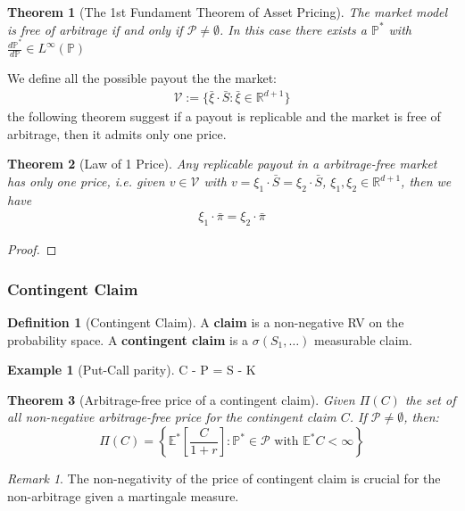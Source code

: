 \documentclass[a4paper,11pt]{book}
\newtheorem{theorem}{Theorem}[section]
\theoremstyle{definition}
\newtheorem{definition}{Definition}[section]
\newtheorem*{example}{Example}
\theoremstyle{remark}
\newtheorem*{remark}{Remark}
\begin{document}
\begin{theorem}[The 1st Fundament Theorem of Asset Pricing]
	The market model is free of arbitrage if and only if $\mathcal{P} \neq \emptyset$. In this case there exists a $\mathbb{P}^*$ with $\frac{d\mathbb{P}^*}{d\mathbb{P}} \in L^\infty(\mathbb{P})$
\end{theorem}

We define all the possible payout the the market:
\begin{align*}
	\mathcal{V}:= \{ \bar{\xi}\cdot \bar{S}: \bar{\xi} \in \mathbb{R}^{d +1}\}
\end{align*}
the following theorem suggest if a payout is replicable and the market is free of arbitrage, then it admits only one price.

\begin{theorem}[Law of 1 Price]
	Any replicable payout in a arbitrage-free market has only one price, i.e. given $v \in \mathcal{V}$ with $v = \xi_1 \cdot \bar{S} = \xi_2 \cdot \bar{S}$, $\xi_1, \xi_2 \in \mathbb{R}^{d +1}$, then we have
	\begin{align*}
		\xi_1 \cdot \bar{\pi}  = \xi_2  \cdot \bar{\pi}
	\end{align*}
\end{theorem}
\begin{proof}
	
\end{proof}


\subsubsection{Contingent Claim}
\begin{definition}[Contingent Claim]
A \textbf{claim} is a non-negative RV on the probability space. A \textbf{contingent claim} is a $\sigma(S_1, \dots)$ measurable claim.
\end{definition}

\begin{example}[Put-Call parity]
	C - P = S - K
\end{example}

\begin{theorem}[Arbitrage-free price of a contingent claim]
	Given $\Pi(C)$ the set of all non-negative arbitrage-free price for the contingent claim $C$. If $\mathcal{P} \neq \emptyset$, then:
	\begin{equation*}
		\Pi(C) = \left\{ \mathbb{E}^*\left[\frac{C}{1+r}\right] :  \mathbb{P}^* \in \mathcal{P} \text{ with } \mathbb{E}^*C < \infty \right\}
	\end{equation*}
\end{theorem}
\begin{remark}
The non-negativity of the price of contingent claim is crucial for the non-arbitrage given a martingale measure.\\
\end{remark}
\end{document}
